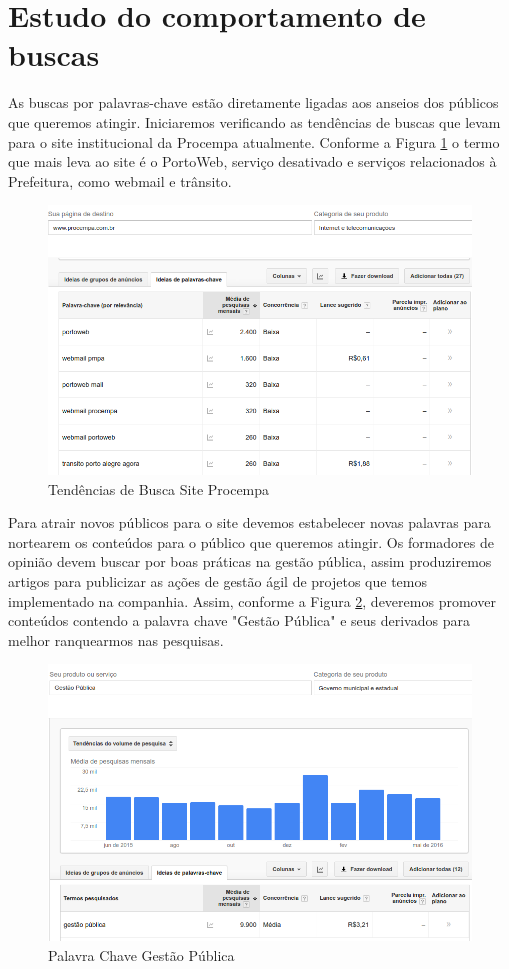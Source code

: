 \section{Estudo do comportamento de buscas}
As buscas por palavras-chave estão diretamente ligadas aos anseios dos públicos que queremos atingir. Iniciaremos verificando as tendências de buscas que levam para o site institucional da Procempa atualmente. Conforme a Figura \ref{fig:busca-site} o termo que mais leva ao site é o PortoWeb, serviço desativado e serviços relacionados à Prefeitura, como webmail e trânsito.

\begin{figure}[!h]
  \centering
    \includegraphics[width=.8\textwidth]{busca-site-procempa}
  \caption{Tendências de Busca Site Procempa}
  \label{fig:busca-site}
\end{figure}

Para atrair novos públicos para o site devemos estabelecer novas palavras para nortearem os conteúdos para o público que queremos atingir. Os formadores de opinião devem buscar por boas práticas na gestão pública, assim produziremos artigos para publicizar as ações de gestão ágil de projetos que temos implementado na companhia. Assim, conforme a Figura \ref{fig:gestao-publica}, deveremos promover conteúdos contendo a palavra chave "Gestão Pública" e seus derivados para melhor ranquearmos nas pesquisas.

\begin{figure}[!h]
  \centering
    \includegraphics[width=.8\textwidth]{gestao-publica}
  \caption{Palavra Chave Gestão Pública}
  \label{fig:gestao-publica}
\end{figure}

